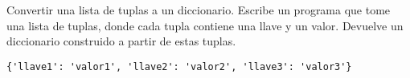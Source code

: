\begin{exercise}
Convertir una lista de tuplas a un diccionario. Escribe un programa
que tome una lista de tuplas, donde cada tupla contiene una llave y un
valor. Devuelve un diccionario construido a partir de estas tuplas.

\begin{Shaded}
\begin{Highlighting}[]
     \NormalTok{(}\NormalTok{(}\NormalTok{ x: (x[}\NormalTok{], x[}\NormalTok{]), lista))}

\OperatorTok{=}\NormalTok{ [(}\NormalTok{, }\NormalTok{), (}\NormalTok{, }\NormalTok{), (}\NormalTok{, }\NormalTok{)]}
\OperatorTok{=}
\end{Highlighting}
\end{Shaded}

\begin{verbatim}
{'llave1': 'valor1', 'llave2': 'valor2', 'llave3': 'valor3'}

\end{verbatim}
\end{exercise}


